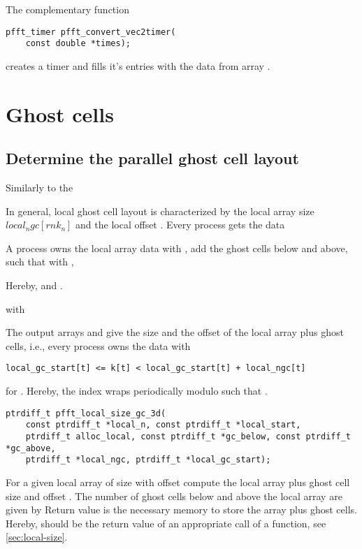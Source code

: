The complementary function
\begin{lstlisting}
pfft_timer pfft_convert_vec2timer(
    const double *times);
\end{lstlisting}
creates a timer and fills it's entries with the data from array .


\section{Ghost cells}

\subsection{Determine the parallel ghost cell layout}

Similarly to the

In general, local ghost cell layout is characterized by the local array size $local_ngc[rnk_n]$ and
the local offset . Every process gets the data

A process owns the local array data
 with ,
add the ghost cells below and above, such that
 with ,

Hereby,  and .

 with 

The output arrays  and  give the size and the offset of the local array plus ghost cells, i.e.,
every process owns the data  with
\begin{lstlisting}
local_gc_start[t] <= k[t] < local_gc_start[t] + local_ngc[t]
\end{lstlisting}
for .
Hereby, the index  wraps periodically modulo  such that .

\begin{lstlisting}
ptrdiff_t pfft_local_size_gc_3d(
    const ptrdiff_t *local_n, const ptrdiff_t *local_start,
    ptrdiff_t alloc_local, const ptrdiff_t *gc_below, const ptrdiff_t *gc_above,
    ptrdiff_t *local_ngc, ptrdiff_t *local_gc_start);
\end{lstlisting}
For a given local array of size  with offset  compute the
local array plus ghost cell size  and offset .
The number of ghost cells below and above the local array are given by
Return value is the necessary memory to store the array plus ghost cells.
Hereby,  should be the return value of an appropriate
call of a  function, see \ref{sec:local-size}.


